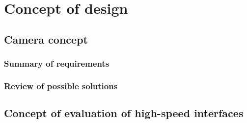 \chapter{Concept of design}

\section{Camera concept}
\subsection{Summary of requirements}
\subsection{Review of possible solutions}

\section{Concept of evaluation of high-speed interfaces}


